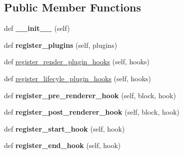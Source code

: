 \subsection*{Public Member Functions}
\begin{DoxyCompactItemize}
\item 
\hypertarget{classtexla_1_1Renderers_1_1Renderer_1_1Renderer_ad7b2d2ad9bd47d4ca6e01efdd9f794bd}{}\label{classtexla_1_1Renderers_1_1Renderer_1_1Renderer_ad7b2d2ad9bd47d4ca6e01efdd9f794bd} 
def {\bfseries \+\_\+\+\_\+init\+\_\+\+\_\+} (self)
\item 
\hypertarget{classtexla_1_1Renderers_1_1Renderer_1_1Renderer_aa65e78017d10f6ccaacf0dffcd009668}{}\label{classtexla_1_1Renderers_1_1Renderer_1_1Renderer_aa65e78017d10f6ccaacf0dffcd009668} 
def {\bfseries register\+\_\+plugins} (self, plugins)
\item 
def \hyperlink{classtexla_1_1Renderers_1_1Renderer_1_1Renderer_ab2a50912d83684b9cd57fc4feccedad6}{register\+\_\+render\+\_\+plugin\+\_\+hooks} (self, hooks)
\item 
def \hyperlink{classtexla_1_1Renderers_1_1Renderer_1_1Renderer_aa5ac1cc3c4e118189bd4497ed03564dd}{register\+\_\+lifecyle\+\_\+plugin\+\_\+hooks} (self, hooks)
\item 
\hypertarget{classtexla_1_1Renderers_1_1Renderer_1_1Renderer_aaea86a5a1ed0006da6fde82f716bfebe}{}\label{classtexla_1_1Renderers_1_1Renderer_1_1Renderer_aaea86a5a1ed0006da6fde82f716bfebe} 
def {\bfseries register\+\_\+pre\+\_\+renderer\+\_\+hook} (self, block, hook)
\item 
\hypertarget{classtexla_1_1Renderers_1_1Renderer_1_1Renderer_a4cedb88a4c46f5a01e2f16b7d432e485}{}\label{classtexla_1_1Renderers_1_1Renderer_1_1Renderer_a4cedb88a4c46f5a01e2f16b7d432e485} 
def {\bfseries register\+\_\+post\+\_\+renderer\+\_\+hook} (self, block, hook)
\item 
\hypertarget{classtexla_1_1Renderers_1_1Renderer_1_1Renderer_a347b7e0aa8e3040911e038fe916c329d}{}\label{classtexla_1_1Renderers_1_1Renderer_1_1Renderer_a347b7e0aa8e3040911e038fe916c329d} 
def {\bfseries register\+\_\+start\+\_\+hook} (self, hook)
\item 
\hypertarget{classtexla_1_1Renderers_1_1Renderer_1_1Renderer_a87c47afda693254e1e6ffaaea96e018b}{}\label{classtexla_1_1Renderers_1_1Renderer_1_1Renderer_a87c47afda693254e1e6ffaaea96e018b} 
def {\bfseries register\+\_\+end\+\_\+hook} (self, hook)
\item 
\hypertarget{classtexla_1_1Renderers_1_1Renderer_1_1Renderer_a2f95c5cc5ea76c75cb5ee79df01f43f2}{}\label{classtexla_1_1Renderers_1_1Renderer_1_1Renderer_a2f95c5cc5ea76c75cb5ee79df01f43f2} 

\end{DoxyCompactItemize}
